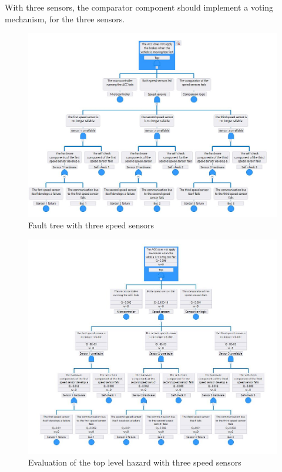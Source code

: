 \documentclass[a4paper]{article}
\begin{document}
With three sensors, the comparator component should implement a voting
mechanism, for the three sensors.

\begin{figure}
	\centering
	\includegraphics[width=\textwidth]{fault_tree_imsc.jpg}
	\caption{Fault tree with three speed sensors}%
	\label{fig:fault_tree_imsc}
\end{figure}

\begin{figure}
	\centering
	\includegraphics[width=\textwidth]{eval_imsc.jpg}
	\caption{Evaluation of the top level hazard with three speed sensors}%
	\label{fig:eval_imsc}
\end{figure}
\end{document}
